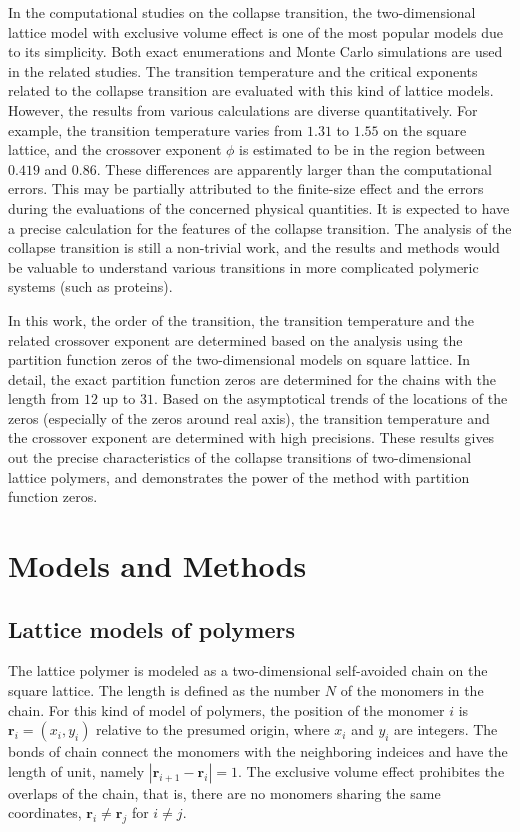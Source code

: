 \documentclass[preprint,preprintnumbers,amsmath,amssymb,showpacs,aps,pre]{revtex4-1}
\begin{document}
In the computational studies on the collapse transition, the
two-dimensional lattice model with exclusive volume effect is
one of the most popular models due to its simplicity. Both exact
enumerations and Monte Carlo simulations are used in the related
studies\cite{SaleurJSP86,DuplantierPRL87,StanleyPRB89,OYJCP08,
DerridaJPA85,SenoJP88,ChangPRE93,HeegerJP95,MurthyPRE01}. The
transition temperature and the critical exponents related to the
collapse transition are evaluated with this kind of lattice models.
However, the results from various calculations are diverse
quantitatively. For example, the transition temperature varies from
$1.31$ to $1.55$ on the square lattice, and the crossover exponent
$\phi$ is estimated to be in the region between $0.419$ and $0.86$.
These differences are apparently larger than the computational
errors. This may be partially attributed to the finite-size effect
and the errors during the evaluations of the concerned physical
quantities. It is expected to have a precise calculation for the
features of the collapse transition. The analysis of the collapse
transition is still a non-trivial work, and the results and methods
would be valuable to understand various transitions in more
complicated polymeric systems (such as proteins\cite{ZivPCCP09}).

In this work, the order of the transition, the transition temperature
and the related crossover exponent are determined based on the analysis
using the partition function zeros of the two-dimensional models
on square lattice. In detail, the exact partition function zeros are
determined for the chains with the length from $12$ up to $31$. Based
on the asymptotical trends of the locations of the zeros (especially
of the zeros around real axis), the transition temperature and the
crossover exponent are determined with high precisions. These results
gives out the precise characteristics of the collapse transitions of
two-dimensional lattice polymers, and demonstrates the power of the
method with partition function zeros.

\section{Models and Methods}

\subsection{Lattice models of polymers}

The lattice polymer is modeled as a two-dimensional self-avoided chain
on the square lattice. The length is defined as the number $N$ of the
monomers in the chain. For this kind of model of polymers, the position
of the monomer $i$ is ${\mathbf r}_i=(x_i,y_i)$ relative to the presumed
origin, where $x_i$ and $y_i$ are integers. The bonds of chain connect
the monomers with the neighboring indeices and have the length of unit,
namely $|{\mathbf r}_{i+1}-{\mathbf r}_i|=1$. The exclusive volume effect
prohibites the overlaps of the chain, that is, there are no monomers sharing
the same coordinates, ${\mathbf r}_i\neq {\mathbf r}_j$ for $i\neq j$. 
\end{document}
